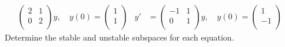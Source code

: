 \documentclass[../psets.tex]{subfiles}
\begin{document}
\begin{enumerate}
\begin{align*}
\begin{pmatrix}
            2 & 1\\
            0 & 2\\
        \end{pmatrix}
        y,\quad
        y(0) =
        \begin{pmatrix}
            1\\
            1\\
        \end{pmatrix}&
        y' &=
        \begin{pmatrix}
            -1 & 1\\
            0 & 1\\
        \end{pmatrix}
        y,\quad
        y(0) =
        \begin{pmatrix}
            1\\
            -1\\
        \end{pmatrix}&
    \end{align*}
    Determine the stable and unstable subspaces for each equation.
\end{enumerate}
\end{document}
